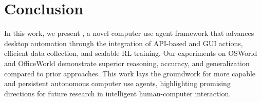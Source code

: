 \section{Conclusion}
In this work, we present \computerrl, a novel computer use agent framework that advances desktop automation through the integration of API-based and GUI actions, efficient data collection, and scalable RL training. Our experiments on OSWorld and OfficeWorld demonstrate superior reasoning, accuracy, and generalization compared to prior approaches. 
This work lays the groundwork for more capable and persistent autonomous computer use agents, highlighting promising directions for future research in intelligent human-computer interaction.